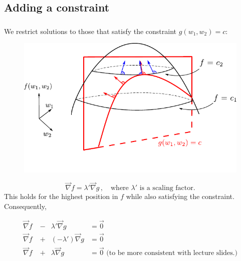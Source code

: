 \subsection{Adding a constraint}
\begin{frame}\frametitle{\subsecname}
We restrict solutions to those that satisfy the constraint $g(w_1, w_2) = c$:

\begin{figure}[h]
\centering
\includegraphics[width=0.8\linewidth]{img/lagrange_objfunction_constrained}
\end{figure}


$$\vec \nabla f = \lambda' \vec \nabla g\,,\quad
\text{where $\lambda'$ is a scaling factor.}
$$
This holds for the highest position in $f$ while also satisfying the constraint.
Consequently,


\begin{centering}
\begin{align*}
  \vec \nabla f \; &-& \lambda' \vec \nabla g     &= \vec 0 \\
  \vec \nabla f \; &+& (- \lambda') \vec \nabla g &= \vec 0 \\
  \vec \nabla f \;  &+& \lambda \vec \nabla g      &= \vec 0 \text{ (to be more consistent with lecture slides.})\\
\end{align*}
\end{centering}
\end{frame}

